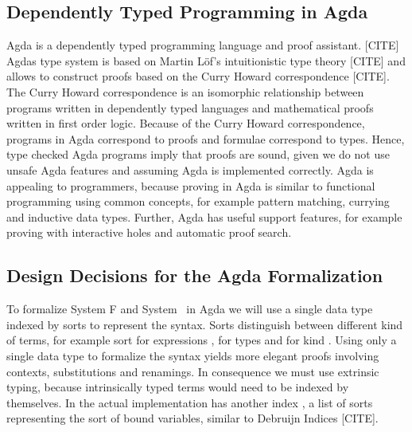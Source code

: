 \subsection{Dependently Typed Programming in Agda}
Agda is a dependently typed programming language and proof assistant. [CITE]
Agdas type system is based on Martin Löf's intuitionistic type theory [CITE] and allows to construct proofs based on the Curry Howard correspondence [CITE]. 
The Curry Howard correspondence is an isomorphic relationship between programs written in dependently typed languages and mathematical proofs written in first order logic. Because of the Curry Howard correspondence, programs in Agda correspond to proofs and formulae correspond to types. 
Hence, type checked Agda programs imply that proofs are sound, given we do not use unsafe Agda features and assuming Agda is implemented correctly. 
Agda is appealing to programmers, because proving in Agda is similar to functional programming using common concepts, for example pattern matching, currying and inductive data types.
Further, Agda has useful support features, for example proving with interactive holes and automatic proof search.
\subsection{Design Decisions for the Agda Formalization}
To formalize System F and System \Fo\ in Agda we will use a single data type  indexed by sorts  to represent the syntax. Sorts distinguish between different kind of terms, for example sort  for expressions ,  for types  and  for kind . Using only a single data type to formalize the syntax yields more elegant proofs involving contexts, substitutions and renamings. In consequence we must use extrinsic typing, because intrinsically typed terms      would need to be indexed by themselves. In the actual implementation  has another index , a list of sorts representing the sort of bound variables, similar to Debruijn Indices [CITE]. 
